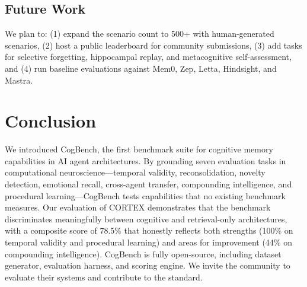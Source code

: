 \documentclass{article}
\begin{document}
\subsection{Future Work}

We plan to: (1) expand the scenario count to 500+ with human-generated scenarios, (2) host a public leaderboard for community submissions, (3) add tasks for selective forgetting, hippocampal replay, and metacognitive self-assessment, and (4) run baseline evaluations against Mem0, Zep, Letta, Hindsight, and Mastra.

\section{Conclusion}
\label{sec:conclusion}

We introduced CogBench, the first benchmark suite for cognitive memory capabilities in AI agent architectures. By grounding seven evaluation tasks in computational neuroscience---temporal validity, reconsolidation, novelty detection, emotional recall, cross-agent transfer, compounding intelligence, and procedural learning---CogBench tests capabilities that no existing benchmark measures. Our evaluation of CORTEX demonstrates that the benchmark discriminates meaningfully between cognitive and retrieval-only architectures, with a composite score of 78.5\% that honestly reflects both strengths (100\% on temporal validity and procedural learning) and areas for improvement (44\% on compounding intelligence). CogBench is fully open-source, including dataset generator, evaluation harness, and scoring engine. We invite the community to evaluate their systems and contribute to the standard.



\end{document}
